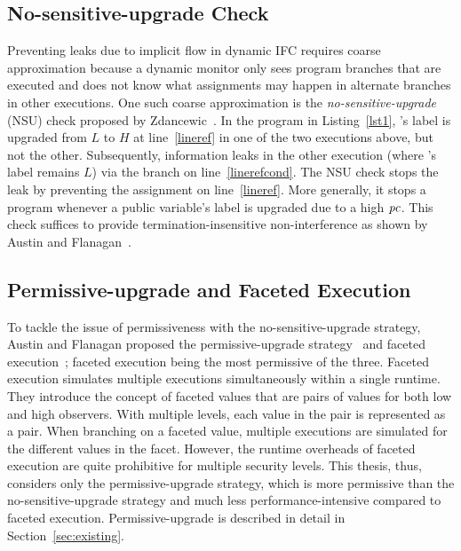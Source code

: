 \subsection{No-sensitive-upgrade Check}
\label{sec:bg-nsu}
Preventing leaks due to implicit flow in dynamic IFC requires coarse
approximation because a dynamic monitor only sees program branches
that are executed and does not know what assignments may happen in
alternate branches in other executions. One such coarse approximation
is the \emph{no-sensitive-upgrade} (NSU) check proposed by
Zdancewic~\cite{zdancewic02PhD}. In the program in Listing~\ref{lst1},
's label is upgraded from $L$ to $H$ at line~\ref{lineref} in one of
the two executions above, but not the other. Subsequently, information
leaks in the other execution (where 's label remains $L$) via the
branch on line~\ref{linerefcond}. The NSU check stops the leak by
preventing the assignment on line~\ref{lineref}. More generally, it
stops a program whenever a public variable's label is upgraded due to
a high $\mathit{pc}$. This check suffices to provide termination-insensitive
non-interference as shown by Austin and Flanagan~\cite{plas09}. 

\subsection{Permissive-upgrade and Faceted Execution}
To tackle the issue of permissiveness with the no-sensitive-upgrade
strategy, Austin and Flanagan proposed 
the permissive-upgrade strategy~\cite{plas10} and faceted
execution~\cite{austin12POPL}; faceted execution being the most
permissive of the three. Faceted execution simulates multiple executions
simultaneously within a single runtime. They introduce the concept of
faceted values that are pairs of values for both low and high
observers. With multiple levels, each value in the pair is represented
as a pair. When branching on a faceted value, multiple executions are
simulated for the different values in the facet. However, the runtime 
overheads of faceted execution are quite prohibitive for multiple security 
levels. This thesis, thus, considers only the permissive-upgrade
strategy, which is more permissive than the no-sensitive-upgrade
strategy and much less performance-intensive compared to faceted
execution. Permissive-upgrade is described in detail in
Section~\ref{sec:existing}. 

